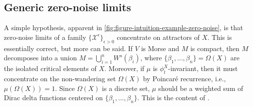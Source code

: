\documentclass[12pt]{article}
\newcommand\colorAutoref[1]{{\hypersetup{linkcolor=blue}\autoref{#1}}}  %
\begin{document}
\subsection{Generic zero-noise limits}
\label{subsection:diffusion-models-zero-noise-limits}
A simple hypothesis, apparent in \colorAutoref{fig:figure-intuition-example-zero-noise}, is that zero-noise limits of a family $\{\mathcal{X}^{\epsilon}\}_{\epsilon>0}$ concentrate on attractors of $X$. This is essentially correct, but more can be said. If $V$ is Morse and $M$ is compact, then $M$ decomposes into a union $M = \bigcup_{i=1}^n W^s(\beta_i)$, where $\{\beta_1,...,\beta_n\} = \Omega(X)$ are the isolated critical elements of $X$. Moreover, if $\mu$ is $\phi_t^X$-invariant, then it must concentrate on the non-wandering set $\Omega(X)$ by Poincaré recurrence, i.e., $\mu(\Omega(X))=1$. Since $\Omega(X)$ is a discrete set, $\mu$ should be a weighted sum of Dirac delta functions centered on $\{\beta_1,...,\beta_n\}$. This is the content of .
\end{document}
